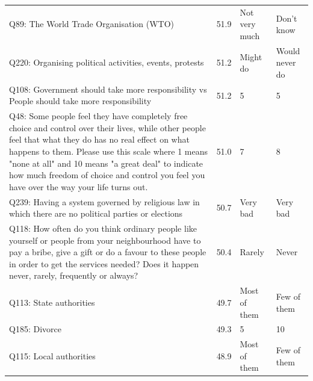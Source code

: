 \begin{tabular}{p{3.1in}lp{1.05in}p{1.05in}}
Q89: The World Trade Organisation (WTO) & 51.9 & Not very much & Don't know \\
Q220: Organising political activities, events, protests & 51.2 & Might do & Would never do \\
Q108: Government should take more responsibility vs People should take more responsibility & 51.2 & 5 & 5 \\
Q48: Some people feel they have completely free choice and control over their lives, while other people feel that what they do has no real effect on what happens to them. Please use this scale where 1 means "none at all" and 10 means "a great deal" to indicate how much freedom of choice and control you feel you have over the way your life turns out. & 51.0 & 7 & 8 \\
Q239: Having a system governed by religious law in which there are no political parties or elections & 50.7 & Very bad & Very bad \\
Q118: How often do you think ordinary people like yourself or people from your neighbourhood have to pay a bribe, give a gift or do a favour to these people in order to get the services needed? Does it happen never, rarely, frequently or always? & 50.4 & Rarely & Never \\
Q113: State authorities & 49.7 & Most of them & Few of them \\
Q185: Divorce & 49.3 & 5 & 10 \\
Q115: Local authorities & 48.9 & Most of them & Few of them \\
\bottomrule
\end{tabular}
